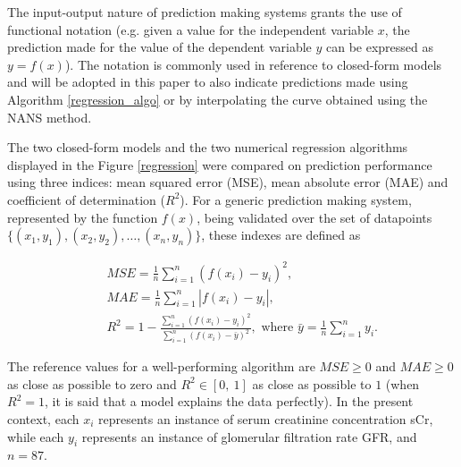 \documentclass[10pt,final]{siamltex}
\begin{document}
The input-output nature of prediction making systems grants the use of functional notation (e.g. given a value for the independent variable $x$, the prediction made for the value of the dependent variable $y$ can be expressed as $y = f(x)$).
The notation is commonly used in reference to closed-form models and will be adopted in this paper to also indicate predictions made using Algorithm \ref{regression_algo} or by interpolating the curve obtained using the NANS method.

The two closed-form models and the two numerical regression algorithms displayed in the Figure \ref{regression} were compared on prediction performance using three indices: mean squared error (MSE), mean absolute error (MAE) and coefficient of determination ($R^2$).
For a generic prediction making system, represented by the function $f(x)$, being validated over the set of datapoints $\lbrace(x_1,y_1), (x_2,y_2), \ldots, (x_n,y_n)\rbrace$, these indexes are defined as

\begin{eqnarray}
  &&\textit{MSE} = \frac{1}{n}\sum_{i=1}^{n}{(f(x_i)-y_i)^2},\\
  &&\textit{MAE} = \frac{1}{n}\sum_{i=1}^{n}{|f(x_i)-y_i|},\\
  &&R^2 = 1 - \frac{\sum_{i=1}^{n}{(f(x_i)-y_i)^2}}{\sum_{i=1}^{n}{(f(x_i)-\bar{y})^2}},
  \text{ where } \bar{y} = \frac{1}{n}\sum_{i=1}^{n}{y_i}.
\end{eqnarray}

The reference values for a well-performing algorithm are $\textit{MSE}\geq 0$ and $\textit{MAE}\geq 0$ as close as possible to zero and $R^2 \in [0,\ 1]$ as close as possible to $1$ (when $R^2=1$, it is said that a model explains the data perfectly).
In the present context, each $x_i$ represents an instance of serum creatinine concentration sCr, while each $y_i$ represents an instance of glomerular filtration rate GFR, and $n = 87$.
\end{document}
